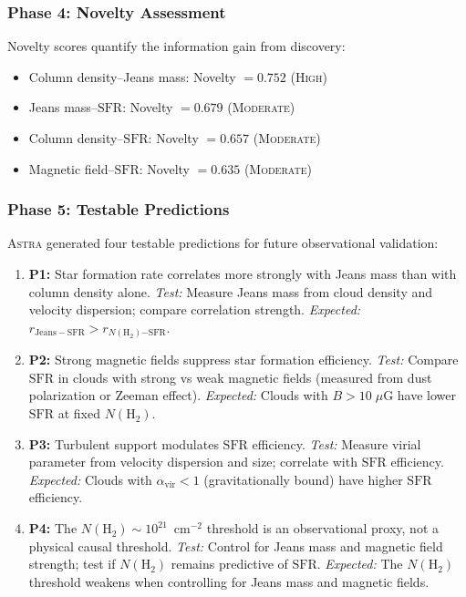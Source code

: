 \documentclass[fleqn,usenatbib]{mnras}
\newcommand{\astra}{\textsc{Astra}\xspace}
\newcommand{\sfr}{\mathrm{SFR}}
\newcommand{\nh}{N(\mathrm{H}_2)}
\begin{document}
\subsubsection{Phase 4: Novelty Assessment}
\label{sec:tc6:phase4}

Novelty scores quantify the information gain from discovery:
\begin{itemize}
  \item Column density--Jeans mass: Novelty $= 0.752$ (\textsc{High})
  \item Jeans mass--$\sfr$: Novelty $= 0.679$ (\textsc{Moderate})
  \item Column density--$\sfr$: Novelty $= 0.657$ (\textsc{Moderate})
  \item Magnetic field--$\sfr$: Novelty $= 0.635$ (\textsc{Moderate})
\end{itemize}

\subsubsection{Phase 5: Testable Predictions}
\label{sec:tc6:phase5}

\astra generated four testable predictions for future observational validation:
\begin{enumerate}
  \item[(i)] \textbf{P1:} Star formation rate correlates more strongly with Jeans mass than with column density alone.
  \emph{Test:} Measure Jeans mass from cloud density and velocity dispersion; compare correlation strength. \emph{Expected:} $r_{\mathrm{Jeans-SFR}} > r_{N(\mathrm{H}_2)\mathrm{-SFR}}$.

  \item[(ii)] \textbf{P2:} Strong magnetic fields suppress star formation efficiency.
  \emph{Test:} Compare $\sfr$ in clouds with strong vs weak magnetic fields (measured from dust polarization or Zeeman effect). \emph{Expected:} Clouds with $B > 10\;\mu$G have lower $\sfr$ at fixed $\nh$.

  \item[(iii)] \textbf{P3:} Turbulent support modulates $\sfr$ efficiency.
  \emph{Test:} Measure virial parameter from velocity dispersion and size; correlate with $\sfr$ efficiency. \emph{Expected:} Clouds with $\alpha_{\mathrm{vir}} < 1$ (gravitationally bound) have higher $\sfr$ efficiency.

  \item[(iv)] \textbf{P4:} The $\nh \sim 10^{21}$~cm$^{-2}$ threshold is an observational proxy, not a physical causal threshold.
  \emph{Test:} Control for Jeans mass and magnetic field strength; test if $\nh$ remains predictive of $\sfr$. \emph{Expected:} The $\nh$ threshold weakens when controlling for Jeans mass and magnetic fields.
\end{enumerate}
\end{document}
